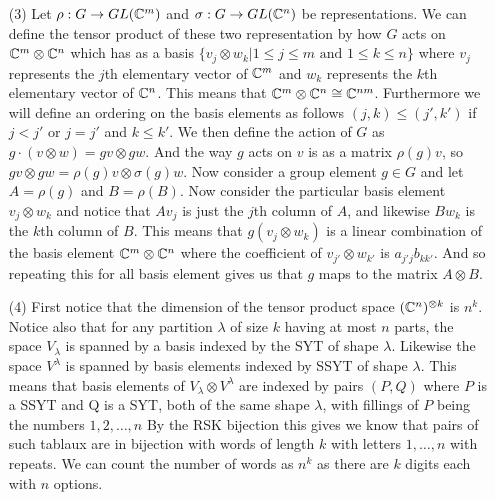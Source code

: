 \documentclass[12pt]{amsart}
\begin{document}
\begin{itemize}
     \item[(3)] Let $\rho:G\rightarrow GL(\mathbb{C}^m)$ and $\sigma:G\rightarrow GL(\mathbb{C}^n)$ be representations. 
     We can define the tensor product of these two representation by how $G$ acts on $\mathbb{C}^{m}\otimes\mathbb{C}^{n}$ which
     has as a basis $\{v_j\otimes w_k | 1\leq j\leq m \text{ and }1\leq k\leq n\}$ where 
     $v_j$ represents the $j$th elementary vector of $\mathbb{C}^m$ and $w_k$ represents the $k$th elementary vector of $\mathbb{C}^n$.
     This means that $\mathbb{C}^m\otimes \mathbb{C}^n\cong \mathbb{C}^{nm}$. Furthermore we will define an ordering on the basis elements as follows
     $(j,k)\leq (j',k')$ if $j<j'$ or $j=j'$ and $k\leq k'$. 
     We then define the action of $G$ as $g\cdot(v\otimes w)= gv\otimes gw$. 
     And the way $g$ acts on $v$ is as a matrix $\rho(g)v$, so
     $gv\otimes gw= \rho(g)v\otimes \sigma(g)w$. Now consider a group element $g\in G$ and let 
     $A=\rho(g)$ and $B=\rho(B)$. Now consider the particular basis element $v_j\otimes w_k$ and notice that 
     $Av_j$ is just the $j$th column of $A$, and likewise $Bw_k$ is the $k$th column of $B$. This means that
     $g(v_j\otimes w_k)$ is a linear combination of the basis element $\mathbb{C}^{m}\otimes \mathbb{C}^{n}$ where the 
     coefficient of $v_{j'}\otimes w_{k'}$ is $a_{j'j}b_{kk'}$. And so repeating this for all basis element 
     gives us that $g$ maps to the matrix $A\otimes B$.
     \\
      
     


     \item[(4)] First notice that the dimension of the tensor product space $(\mathbb{C}^n)^{\otimes k}$ is $n^k$. 
     Notice also that for any partition $\lambda$ of size $k$ having at most $n$ parts, the space $V_\lambda$ is spanned by a 
     basis indexed by the SYT of shape $\lambda$. Likewise the space $V^{\lambda}$ is spanned by basis elements indexed by SSYT of shape $\lambda$.
     This means that basis elements of $V_\lambda\otimes V^{\lambda}$ are indexed by pairs $(P,Q)$ 
     where $P$ is a SSYT and Q is a SYT, both of the same shape $\lambda$, with fillings of $P$ being the numbers $1,2,\dots, n$
     By the RSK bijection this gives we know that pairs of such tablaux are in bijection with words of length $k$ with letters $1,\dots, n$ with repeats.
     We can count the number of words as $n^k$ as there are $k$ digits each with $n$ options.\\




\end{itemize}
\end{document}
